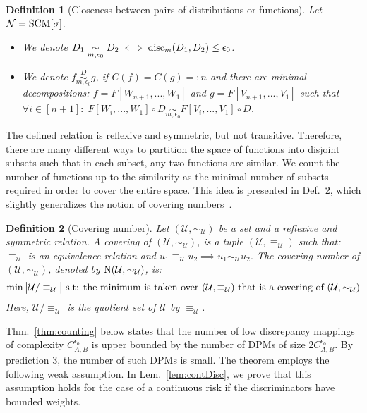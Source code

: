 \documentclass{article} %
\newtheorem{defn}{Definition}
\newcommand{\disc}{\textnormal{disc}}
\newcommand{\Cov}{\textnormal{N}}
\begin{document}
\begin{defn}[Closeness between pairs of distributions or functions]\label{def:closed} Let $\mathcal{N} = \textnormal{SCM}[\sigma]$. 
\begin{itemize}
\item We denote $D_1 \underset{m,\epsilon_0}{\sim} D_2 \iff \disc_m(D_1,D_2) \leq \epsilon_0$.
\item We denote $f\overset{D}{\underset{m,\epsilon_0}{\sim}} g $, if $C(f) = C(g) =: n$ and there are minimal decompositions: $f = F[W_{n+1},...,W_1]$ and $g = F[V_{n+1},...,V_1]$ such that $\forall i \in [n+1]:\; F[W_{i},...,W_1] \circ D  \underset{m,\epsilon_0}{\sim} F[V_{i},...,V_1] \circ D$.
\end{itemize}
\end{defn}

The defined relation is reflexive and symmetric, but not transitive. Therefore, there are many different ways to partition the space of functions into disjoint subsets such that in each subset, any two functions are similar. We count the number of functions up to the similarity as the minimal number of subsets required in order to cover the entire space. This idea is presented in Def.~\ref{def:covering}, which slightly generalizes the notion of covering numbers~\citep{Anthony:2009:NNL:1795646}.

 

\begin{defn}[Covering number]\label{def:covering} Let $(\mathcal{U},\sim_\mathcal{U})$ be a set and a reflexive and symmetric relation. A covering of $(\mathcal{U},\sim_\mathcal{U})$, is a tuple $(\mathcal{U},\equiv_\mathcal{U})$ such that: $\equiv_{\mathcal{U}}$ is an equivalence relation and $u_1 \equiv_{\mathcal{U}} u_2 \implies u_1 \sim_{\mathcal{U}} u_2$. The covering number of $(\mathcal{U},\sim_\mathcal{U})$, denoted by $\Cov (\mathcal{U},\sim_\mathcal{U})$, is:
\begin{equation}
\begin{aligned}
\min\big\vert \mathcal{U}/\equiv_{\mathcal{U}} \big\vert \textnormal{ s.t: the minimum is taken over 
$(\mathcal{U},\equiv_\mathcal{U})$ that is a covering of $(\mathcal{U},\sim_\mathcal{U})$}
\end{aligned}
\end{equation}
Here, $\mathcal{U}/\equiv_{\mathcal{U}}$ is the quotient set of $\mathcal{U}$ by $\equiv_{\mathcal{U}}$.
\end{defn}

Thm.~\ref{thm:counting} below states that the number of low discrepancy mappings of complexity $C^{\epsilon_0}_{A,B}$ is upper bounded by the number of DPMs of size $2C^{\epsilon_0}_{A,B}$. By prediction 3, the number of such DPMs is small. The theorem employs the following weak assumption. In Lem.~\ref{lem:contDisc}, we prove that this assumption holds for the case of a continuous risk if the discriminators have bounded weights.
\end{document}
